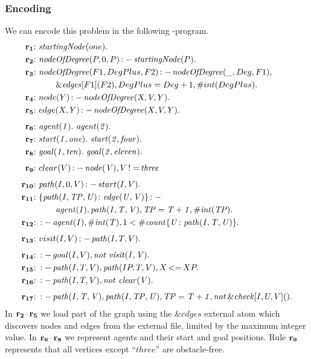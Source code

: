 \documentclass[a4paper, titlepage]{article}
\newcommand{\mi}[1]{\mathit{#1}}
\newcommand{\ext}[3]{\ensuremath{\&{\mathit{#1}}[#2](#3)}}
\DeclareMathOperator{\leftimpl}{:-}
\DeclareMathOperator{\nott}{\mathit{not}}
\DeclareMathOperator{\noteq}{!=}
\DeclareMathOperator{\lesseq}{<=}
\newcommand{\row}[1]{%
  \ensuremath{\color{black}\ensuremath{\mathbf{#1}} \color{black}}%
}
\newcommand{\rowprefix}[1]{%
  \ensuremath{\color{black}\mathbf{#1{:}}\ }%
}
\begin{document}
\subsubsection{Encoding}
We can encode this problem
in the following \hex-program.
\begin{align*}
\rowprefix{r_1} & \mi{startingNode}(one). \\
\rowprefix{r_2} & \mi{nodeOfDegree}(P,0,P) \leftimpl \mi{startingNode}(P).  \\
\rowprefix{r_3} & \mi{nodeOfDegree}(F1, DegPlus, F2)
    \leftimpl \mi{nodeOfDegree}(\_, Deg, F1), \\
  & \qquad \ext{edges}{F1}{F2}, DegPlus=Deg+1, \#int(DegPlus).  \\
\rowprefix{r_4} & node(Y) \leftimpl \mi{nodeOfDegree}(X, V, Y).  \\
\rowprefix{r_5} & edge(X,Y) \leftimpl \mi{nodeOfDegree}(X,V,Y).\\[1ex]
\rowprefix{r_6} & \mathit{agent(1). } \ \mathit{agent(2).}\\
\rowprefix{r_7} & \mathit{start(1,one).} \ \mathit{start(2,four).} \\
\rowprefix{r_8} & \mathit{goal(1,ten).} \ \mathit{goal(2,eleven).} \\[1ex]
\rowprefix{r_9} & clear(V) \leftimpl
  \mathit{node(V)}, V \noteq \mathit{three} \\[1ex]
\rowprefix{r_{10}} & \mi{path}(I,0,V) \leftimpl start(I,V). \\
\rowprefix{r_{11}} & \{ \mi{path(I,TP,U)} \colon \mi{edge(U,V)} \}
  \leftimpl \\
  &\qquad \mathit{agent(I)}, \mathit{path(I,T,V)},
    \mathit{TP=T+1}, \mathit{\#int(TP)}. \\
\rowprefix{r_{12}} &
  \leftimpl \mathit{agent(I)}, \mathit{\#int(T)},
    1 < \mathit{\#count\{ U \colon \mi{path}(I, T, U) \}}. \\[1ex]
\rowprefix{r_{13}} & visit(I, V) \leftimpl \mi{path}(I,T,V). \\[1ex]
\rowprefix{r_{14}} &
  \leftimpl goal(I, V), \nott \thinspace  \mathit{visit(I, V).} \\
\rowprefix{r_{15}} &
  \leftimpl \mi{path}(I, T, V), \mi{path}(IP,T,V), X \lesseq XP. \\
\rowprefix{r_{16}} &
  \leftimpl \mi{path}(I,T,V), \nott \thinspace  \mathit{clear(V).}\\[1ex]
\rowprefix{r_{17}} & \leftimpl \mi{path(I,T,V)}, \mi{path(I,TP,U)},
  \mi{TP=T+1}, \nott \ext{check}{I,U,V}{}.
\end{align*}
%
In $\row{r_2}$--$\row{r_5}$ we load part of the graph using 
the $\&edges$ external atom
which discovers nodes and edges from the external file,
limited by the maximum integer value.
%
In $\row{r_6}$--$\row{r_8}$
we represent agents and their start and goal positions.
%
Rule $\row{r_9}$ represents that all vertices
except \enquote{$three$} are obstacle-free.
\end{document}
